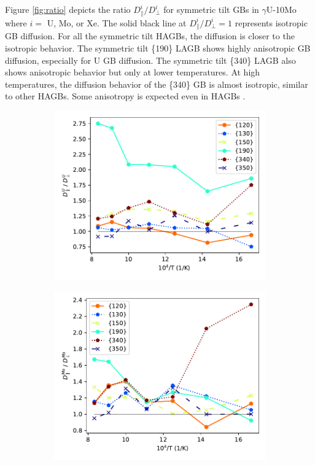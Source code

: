 \documentclass{elsarticle}
\begin{document}
Figure \ref{fig:ratio} depicts the ratio $D^i_{\parallel} / D^i_{\perp}$ for symmetric tilt GBs in $\gamma$U-10Mo where $i =$ U, Mo, or Xe. The solid black line at $D^i_{\parallel} / D^i_{\perp} = 1$ represents isotropic GB diffusion. For all the symmetric tilt HAGBs, the diffusion is closer to the isotropic behavior. The symmetric tilt \{190\} LAGB shows highly anisotropic GB diffusion, especially for U GB diffusion. The symmetric tilt \{340\} LAGB also shows anisotropic behavior but only at lower temperatures. At high temperatures, the diffusion behavior of the \{340\} GB is almost isotropic, similar to other HAGBs. Some anisotropy is expected even in HAGBs \cite{mishin1997}.

\begin{figure}[!ht]
    \centering
    \begin{subfigure}{0.49\textwidth}
        \centering
        \caption{}
        \includegraphics[width=\textwidth]{ratio_U.pdf}
    \end{subfigure}
    \begin{subfigure}{0.49\textwidth}
        \centering
        \caption{}
        \includegraphics[width=\textwidth]{ratio_Mo.pdf}

\end{subfigure}
\end{figure}
\end{document}
